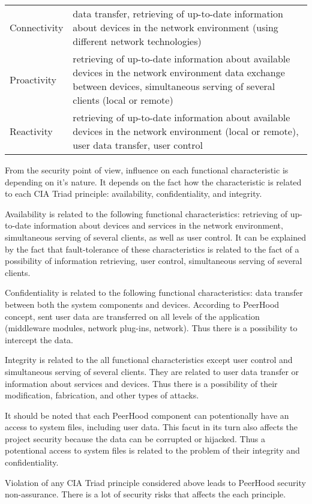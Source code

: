  {
	\begin{tabular}{ | p{4cm} | p{10cm} | }
	  \hline                       
	  \Bold{Goal} & \Bold{Characteristics} \\ \hline
	  Connectivity & data transfer, retrieving of up-to-date information about devices in the network environment (using different network technologies) \\ \hline
	  Proactivity & retrieving of up-to-date information about available devices in the network environment data exchange between devices,  simultaneous serving of several clients (local or remote) \\ \hline
	  Reactivity & retrieving of up-to-date information about available devices in the network environment (local or remote), user data transfer, user control \\ \hline
	\end{tabular}
}

%
From the security point of view, influence on each functional characteristic is  depending on it's nature. 
%
It depends on the fact how the characteristic is related to each CIA Triad principle: availability, confidentiality, and integrity. 

%
Availability is related to the following functional characteristics: retrieving of up-to-date information about devices and services in the network environment, simultaneous serving of several clients, as well as user control. 
%
It can be explained by the fact that fault-tolerance of these characteristics is related to the fact of a possibility of information retrieving, user control, simultaneous serving of several clients. 

%
Confidentiality is related to the following functional characteristics: data transfer between both the system components and devices. 
%
According to PeerHood concept, sent user data are transferred on all levels of the application (middleware modules, network plug-ins, network). 
%
Thus there is a possibility to intercept the data. 

%
Integrity is related to the all functional characteristics except user control and simultaneous serving of several clients. 
%
They are related to user data transfer or information about services and devices. 
%
Thus there is a possibility of their modification, fabrication, and other types of attacks. 

%
It should be noted that each PeerHood component can potentionally have an access to system files, including user data. 
%
This facut in its turn also affects the project security because the data can be corrupted or hijacked. 
%
Thus a potentional access to system files is related to the problem of their integrity and confidentiality. 

%
Violation of any CIA Triad principle considered above leads to PeerHood security non-assurance. 
%
There is a lot of security risks that affects the each principle. 